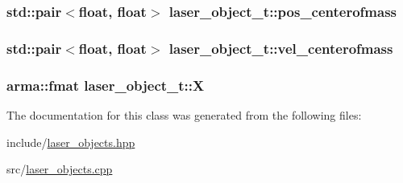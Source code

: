 \subsubsection[{\texorpdfstring{pos\+\_\+centerofmass}{pos_centerofmass}}]{\setlength{\rightskip}{0pt plus 5cm}std\+::pair$<$float, float$>$ laser\+\_\+object\+\_\+t\+::pos\+\_\+centerofmass\hspace{0.3cm}{\ttfamily [private]}}\hypertarget{classlaser__object__t_a13f0ed1ba0a9050bae6db84f3d5f2650}{}\label{classlaser__object__t_a13f0ed1ba0a9050bae6db84f3d5f2650}
\subsubsection[{\texorpdfstring{vel\+\_\+centerofmass}{vel_centerofmass}}]{\setlength{\rightskip}{0pt plus 5cm}std\+::pair$<$float, float$>$ laser\+\_\+object\+\_\+t\+::vel\+\_\+centerofmass\hspace{0.3cm}{\ttfamily [private]}}\hypertarget{classlaser__object__t_a7d49fa1260aa38bba4b9ab57d56567ba}{}\label{classlaser__object__t_a7d49fa1260aa38bba4b9ab57d56567ba}
\subsubsection[{\texorpdfstring{X}{X}}]{\setlength{\rightskip}{0pt plus 5cm}arma\+::fmat laser\+\_\+object\+\_\+t\+::X\hspace{0.3cm}{\ttfamily [private]}}\hypertarget{classlaser__object__t_aac25929dd97f4189689280e1d13b001a}{}\label{classlaser__object__t_aac25929dd97f4189689280e1d13b001a}


The documentation for this class was generated from the following files\+:\begin{DoxyCompactItemize}
\item 
include/\hyperlink{laser__objects_8hpp}{laser\+\_\+objects.\+hpp}\item 
src/\hyperlink{laser__objects_8cpp}{laser\+\_\+objects.\+cpp}\end{DoxyCompactItemize}
